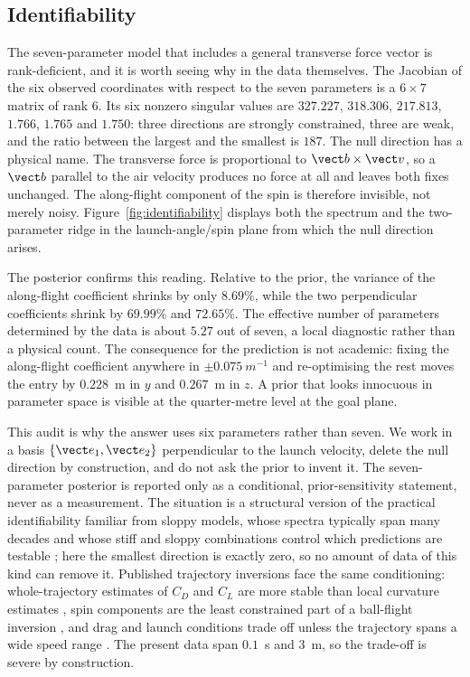 \subsection{Identifiability}
\label{sec:identifiability}

The seven-parameter model that includes a general transverse force vector is
rank-deficient, and it is worth seeing why in the data themselves. The Jacobian of
the six observed coordinates with respect to the seven parameters is a $6\times7$
matrix of rank $6$. Its six nonzero singular values are $327.227$, $318.306$,
$217.813$, $1.766$, $1.765$ and $1.750$: three directions are strongly
constrained, three are weak, and the ratio between the largest and the smallest is
$187$. The null direction has a physical name. The transverse force is
proportional to $\vect b\times\vect v$, so a $\vect b$ parallel to the air
velocity produces no force at all and leaves both fixes unchanged. The
along-flight component of the spin is therefore invisible, not merely noisy.
Figure~\ref{fig:identifiability} displays both the spectrum and the
two-parameter ridge in the launch-angle/spin plane from which the null direction
arises.

The posterior confirms this reading. Relative to the prior, the variance of the
along-flight coefficient shrinks by only $8.69\%$, while the two perpendicular
coefficients shrink by $69.99\%$ and $72.65\%$. The effective number of parameters
determined by the data is about $5.27$ out of seven, a local diagnostic rather
than a physical count. The consequence for the prediction is not academic:
fixing the along-flight coefficient anywhere in $\pm0.075~\si{m^{-1}}$ and
re-optimising the rest moves the entry by $0.228$~m in $y$ and $0.267$~m in $z$.
A prior that looks innocuous in parameter space is visible at the quarter-metre
level at the goal plane.

This audit is why the answer uses six parameters rather than seven. We work in a
basis $\{\vect e_1,\vect e_2\}$ perpendicular to the launch velocity, delete the
null direction by construction, and do not ask the prior to invent it. The
seven-parameter posterior is reported only as a conditional, prior-sensitivity
statement, never as a measurement. The situation is a structural version of the
practical identifiability familiar from sloppy models, whose spectra typically
span many decades and whose stiff and sloppy combinations control which
predictions are testable \citep{gutenkunst2007,white2017}; here the smallest
direction is exactly zero, so no amount of data of this kind can remove it.
Published trajectory inversions face the same conditioning: whole-trajectory
estimates of $C_D$ and $C_L$ are more stable than local curvature estimates
\citep{jsme2014}, spin components are the least constrained part of a
ball-flight inversion \citep{nathan2008pitchfx}, and drag and launch conditions
trade off unless the trajectory spans a wide speed range \citep{florio2019}. The
present data span $0.1$~s and $3$~m, so the trade-off is severe by construction.

